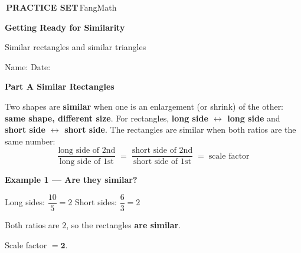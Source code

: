 \documentclass[11pt]{article}
\newcommand{\badge}[1]{\colorbox{fmtitle}{\color{white}\bfseries\small\,#1\,}}
\newcommand{\parttitle}[2]{\needspace{6cm}\vspace{4mm}%
  {\colorbox{fmtitle}{\parbox{\dimexpr\linewidth-2\fboxsep}{\color{white}\bfseries\large Part #1 \quad #2}}}\par\vspace{3mm}}
\begin{document}
\badge{PRACTICE SET}\hfill{\color{fmgray}\small FangMath}\par\vspace{3mm}
{\color{fmtitle}\bfseries\LARGE Getting Ready for Similarity}\par\vspace{1mm}
{\color{fmgray}\large Similar rectangles and similar triangles}\par\vspace{4mm}
Name: \underline{\hspace{6cm}} \hfill Date: \underline{\hspace{3.5cm}}\par\vspace{2mm}

\parttitle{A}{Similar Rectangles}
\begin{keyidea}
Two shapes are \textbf{similar} when one is an enlargement (or shrink) of the other: \textbf{same shape, different size}.
For rectangles, \textbf{long side $\leftrightarrow$ long side} and \textbf{short side $\leftrightarrow$ short side}. The rectangles are similar when both ratios are the same number:
\[ \frac{\text{long side of 2nd}}{\text{long side of 1st}} \;=\; \frac{\text{short side of 2nd}}{\text{short side of 1st}} \;=\; \text{scale factor} \]
\end{keyidea}
\begin{watchme}\textbf{Example 1 --- Are they similar?}\par\vspace{2mm}\begin{minipage}[c]{0.42\linewidth}\centering {}\end{minipage}\hfill\begin{minipage}[c]{0.55\linewidth}Long sides: $\dfrac{10}{5} = 2$ \qquad Short sides: $\dfrac{6}{3} = 2$\par\vspace{1mm}Both ratios are $2$, so the rectangles \textbf{are similar}.\par Scale factor $=\mathbf{2}$.\end{minipage}\end{watchme}
\end{document}
